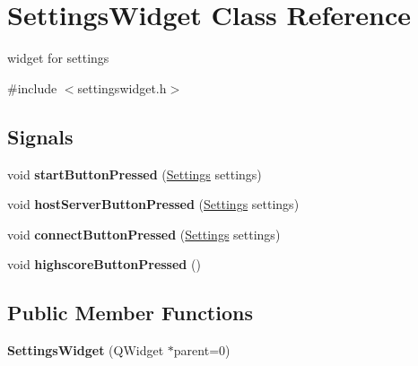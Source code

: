 \hypertarget{classSettingsWidget}{\section{\-Settings\-Widget \-Class \-Reference}
\label{classSettingsWidget}
}


widget for settings  




{\ttfamily \#include $<$settingswidget.\-h$>$}

\subsection*{\-Signals}
\begin{DoxyCompactItemize}
\item 
\hypertarget{classSettingsWidget_a0dc3dbbc8b45cae0480cf727ad53c77a}{void {\bfseries start\-Button\-Pressed} (\hyperlink{structSettings}{\-Settings} settings)}\label{classSettingsWidget_a0dc3dbbc8b45cae0480cf727ad53c77a}

\item 
\hypertarget{classSettingsWidget_a3318e4fa37e5fc7aa7b6b272345b9853}{void {\bfseries host\-Server\-Button\-Pressed} (\hyperlink{structSettings}{\-Settings} settings)}\label{classSettingsWidget_a3318e4fa37e5fc7aa7b6b272345b9853}

\item 
\hypertarget{classSettingsWidget_a5d848f32b81af10a30d678816d15fdf4}{void {\bfseries connect\-Button\-Pressed} (\hyperlink{structSettings}{\-Settings} settings)}\label{classSettingsWidget_a5d848f32b81af10a30d678816d15fdf4}

\item 
\hypertarget{classSettingsWidget_a7ee9f48c228d92314768f2e63dcc2b55}{void {\bfseries highscore\-Button\-Pressed} ()}\label{classSettingsWidget_a7ee9f48c228d92314768f2e63dcc2b55}

\end{DoxyCompactItemize}
\subsection*{\-Public \-Member \-Functions}
\begin{DoxyCompactItemize}
\item 
\hypertarget{classSettingsWidget_ab381a630fcf24d7fe49ab7bd2896c052}{{\bfseries \-Settings\-Widget} (\-Q\-Widget $\ast$parent=0)}\label{classSettingsWidget_ab381a630fcf24d7fe49ab7bd2896c052}

\end{DoxyCompactItemize}


